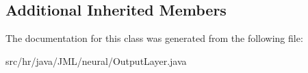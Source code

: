 \subsection*{Additional Inherited Members}


The documentation for this class was generated from the following file\+:\begin{DoxyCompactItemize}
\item 
src/hr/java/\+J\+M\+L/neural/Output\+Layer.\+java\end{DoxyCompactItemize}
